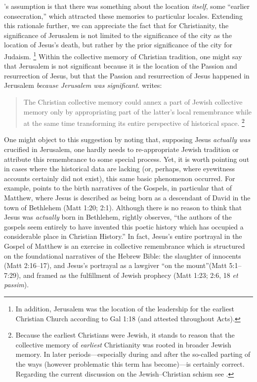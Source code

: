 \halbwachs's assumption is that there was something about the location \emph{itself}, some ``earlier consecration,''\autocite[220]{halbwachs1992} which attracted these memories to particular locales. Extending this rationale further, we can appreciate the fact that for Christianity, the significance of Jerusalem is not limited to the significance of the city as the location of Jesus's death, but rather by the prior significance of the city for Judaism.%
%
\footnote{In addition, Jerusalem was the location of the leadership for the earliest Christian Church according to Gal 1:18 (and attested throughout Acts).}
%
Within the collective memory of Christian tradition, one might say that Jerusalem is not significant because it is the location of the Passion and resurrection of Jesus, but that the Passion and resurrection of Jesus happened in Jerusalem \emph{because Jerusalem was significant}. \halbwachs writes:  

\begin{quote}
The Christian collective memory could annex a part of Jewish collective memory only by appropriating part of the latter's local remembrance while at the same time transforming its entire perspective of historical space.\autocite[215]{halbwachs1992}%
%
\footnote{Because the earliest Christians were Jewish, it stands to reason that the collective memory of \emph{earliest} Christianity was rooted in broader Jewish memory. In later periods---especially during and after the so-called parting of the ways (however problematic this term has become)---\halbwachs is certainly correct. Regarding the current discussion on the Jewish--Christian schism see \cite[19--60]{burns2016}.}
\end{quote}  

One might object to this suggestion by noting that, supposing Jesus \emph{actually was} crucified in Jerusalem, one hardly needs to re-appropriate Jewish tradition or attribute this remembrance to some special process. Yet, it is worth pointing out in cases where the historical data are lacking (or, perhaps, where eyewitness accounts certainly did not exist), this same basic phenomenon occurred. For example, \halbwachs points to the birth narratives of the Gospels, in particular that of Matthew, where Jesus is described as being born as a descendant of David in the town of Bethlehem (Matt 1:20; 2:1). Although there is no reason to think that Jesus was \emph{actually} born in Bethlehem, \halbwachs rightly observes, ``the authors of the gospels seem entirely to have invented this poetic history which has occupied a considerable place in Christian History.''\autocite[214]{halbwachs1992} In fact, Jesus's entire portrayal in the Gospel of Matthew is an exercise in collective remembrance which is structured on the foundational narratives of the Hebrew Bible: the slaughter of innocents (Matt 2:16--17), and Jesus's portrayal as a lawgiver ``on the mount''(Matt 5:1--7:29), and framed as the fulfillment of Jewish prophecy (Matt 1:23; 2:6, 18 \emph{et passim}). 

